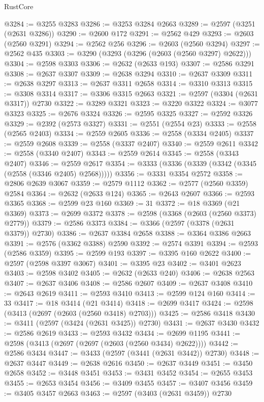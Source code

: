 \begin{lexlean}{RustCore}
\begin{coremodule}
@3284 := @3255 @3283
@3286 := @3253 @3284 @2663
@3289 := @2597 (@3251 (@2631 @3286))
@3290 := @2600 @172
@3291 := @2562 @429
@3293 := @2603 (@2560 @3291)
@3294 := @2562 @256
@3296 := @2603 (@2560 @3294)
@3297 := @2562 @435
@3303 := @3290 (@3293 (@3296 (@2603 (@2560 @3297) @2622)))
@3304 := @2598 @3303
@3306 := @2632 (@2633 @193)
@3307 := @2586 @3291
@3308 := @2637 @3307
@3309 := @2638 @3294
@3310 := @2637 @3309
@3311 := @2638 @3297
@3313 := @2637 @3311 @2658
@3314 := @3310 @3313
@3315 := @3308 @3314
@3317 := @3306 @3315 @2663
@3321 := @2597 (@3304 (@2631 @3317)) @2730
@3322 := @3289 @3321
@3323 := @3220 @3322
@3324 := @3077 @3323
@3325 := @2676 @3324
@3326 := @2595 @3325
@3327 := @2592 @3326
@3329 := @2392 (@2573 @3327)
@3331 := @2551 (@2554 @23)
@3333 := @2558 (@2565 @2403)
@3334 := @2559 @2605
@3336 := @2558 (@3334 @2405)
@3337 := @2559 @2608
@3339 := @2558 (@3337 @2407)
@3340 := @2559 @2611
@3342 := @2558 (@3340 @2407)
@3343 := @2559 @2614
@3345 := @2558 (@3343 @2407)
@3346 := @2559 @2617
@3354 := @3333 (@3336 (@3339 (@3342 (@3345 (@2558 (@3346 @2405) @2568)))))
@3356 := @3331 @3354 @2572
@3358 := @2806 @2639 @3067
@3359 := @2579 @1112
@3362 := @2577 (@2560 @3359) @2584
@3364 := @2632 (@2633 @124)
@3365 := @2643 @2607
@3366 := @2593 @3365
@3368 := @2599 @23 @160
@3369 := 31
@3372 := @18 @3369 (@21 @3369)
@3373 := @2699 @3372
@3378 := @2598 (@3368 (@2603 (@2560 @3373) @2779))
@3379 := @2586 @3373
@3384 := @3366 (@2597 (@3378 (@2631 @3379)) @2730)
@3386 := @2637 @3384 @2658
@3388 := @3364 @3386 @2663
@3391 := @2576 (@3362 @3388) @2590
@3392 := @2574 @3391
@3394 := @2593 (@2586 @3359)
@3395 := @2599 @193
@3397 := @3395 @160 @2622
@3400 := @2597 (@2598 @3397 @3067)
@3401 := @3395 @23
@3402 := @3401 @2623
@3403 := @2598 @3402
@3405 := @2632 (@2633 @240)
@3406 := @2638 @2563
@3407 := @2637 @3406
@3408 := @2586 @2607
@3409 := @2637 @3408
@3410 := @2643 @2619
@3411 := @2593 @3410
@3413 := @2599 @124 @160
@3414 := 33
@3417 := @18 @3414 (@21 @3414)
@3418 := @2699 @3417
@3424 := @2598 (@3413 (@2697 (@2603 (@2560 @3418) @2703)))
@3425 := @2586 @3418
@3430 := @3411 (@2597 (@3424 (@2631 @3425)) @2730)
@3431 := @2637 @3430
@3432 := @2586 @2619
@3433 := @2593 @3432
@3434 := @2699 @1195
@3441 := @2598 (@3413 (@2697 (@2697 (@2603 (@2560 @3434) @2622))))
@3442 := @2586 @3434
@3447 := @3433 (@2597 (@3441 (@2631 @3442)) @2730)
@3448 := @2637 @3447
@3449 := @2638 @2616
@3450 := @2637 @3449
@3451 := @3450 @2658
@3452 := @3448 @3451
@3453 := @3431 @3452
@3454 := @2655 @3453
@3455 := @2653 @3454
@3456 := @3409 @3455
@3457 := @3407 @3456
@3459 := @3405 @3457 @2663
@3463 := @2597 (@3403 (@2631 @3459)) @2730

\end{coremodule}
\end{lexlean}
